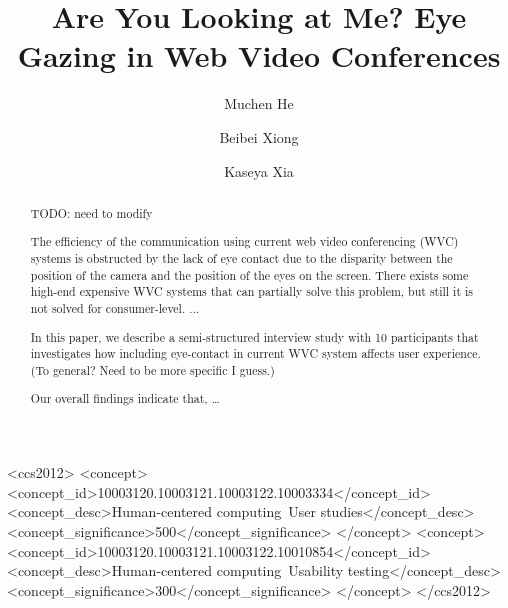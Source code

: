 \documentclass[sigconf,authordraft]{acmart}
\begin{document}
\title{Are You Looking at Me? Eye Gazing in Web Video Conferences}

\author{Muchen He}

\author{Beibei Xiong}

\author{Kaseya Xia}


\begin{abstract}
TODO: need to modify

The efficiency of the communication using current web video conferencing (WVC) systems is obstructed by the lack of eye contact due to the disparity between the position of the camera and the position of the eyes on the screen. There exists some high-end expensive WVC systems that can partially solve this problem, but still it is not solved for consumer-level. ...

In this paper, we describe a semi-structured interview study with 10 participants that investigates how including eye-contact in current WVC system affects user experience. (To general? Need to be more specific I guess.)

Our overall findings indicate that, …


\end{abstract}

\begin{CCSXML}
<ccs2012>
<concept>
<concept_id>10003120.10003121.10003122.10003334</concept_id>
<concept_desc>Human-centered computing~User studies</concept_desc>
<concept_significance>500</concept_significance>
</concept>
<concept>
<concept_id>10003120.10003121.10003122.10010854</concept_id>
<concept_desc>Human-centered computing~Usability testing</concept_desc>
<concept_significance>300</concept_significance>
</concept>
</ccs2012>
\end{CCSXML}


\end{document}

